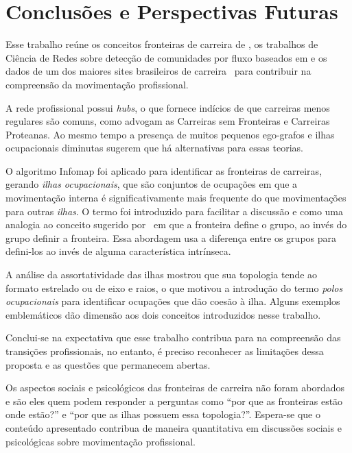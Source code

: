 \documentclass[
  article,
  11pt,
  a4paper,
  english,
  brazil,
  sumario=tradicional]{abntex2}
\begin{document}
\section{Conclusões e Perspectivas Futuras}

Esse trabalho reúne os conceitos fronteiras de carreira de , os trabalhos de Ciência de Redes sobre detecção de comunidades por fluxo baseados em \cite{Rosvall2009-sd} e os dados de um dos maiores sites brasileiros de carreira~\cite{VAGAS_Tecnologia2014-yv} para contribuir na compreensão da movimentação profissional.

A rede profissional possui \textit{hubs}, o que fornece indícios de que carreiras menos regulares são comuns, como advogam as Carreiras sem Fronteiras e Carreiras Proteanas. Ao mesmo tempo a presença de muitos pequenos ego-grafos e ilhas ocupacionais diminutas sugerem que há alternativas para essas teorias.

O algoritmo Infomap foi aplicado para identificar as fronteiras de carreiras, gerando \textit{ilhas ocupacionais}, que são conjuntos de ocupações em que a movimentação interna é significativamente mais frequente do que movimentações para outras \textit{ilhas}. O termo foi introduzido para facilitar a discussão e como uma analogia ao conceito sugerido por~\cite{Abbott1995-ft} em que a fronteira define o grupo, ao invés do grupo definir a fronteira. Essa abordagem usa a diferença entre os grupos para defini-los ao invés de alguma característica intrínseca. 

A análise da assortatividade das ilhas mostrou que sua topologia tende ao formato estrelado ou de eixo e raios, o que motivou a introdução do termo \textit{polos ocupacionais} para identificar ocupações que dão coesão à ilha. Alguns exemplos emblemáticos dão dimensão aos dois conceitos introduzidos nesse trabalho.

Conclui-se na expectativa que esse trabalho contribua para na compreensão das transições profissionais, no entanto, é preciso reconhecer as limitações dessa proposta e as questões que permanecem abertas.

Os aspectos sociais e psicológicos das fronteiras de carreira não foram abordados e são eles quem podem responder a perguntas como \enquote{por que as fronteiras estão onde estão?} e \enquote{por que as ilhas possuem essa topologia?}. Espera-se que o conteúdo apresentado contribua de maneira quantitativa em discussões sociais e psicológicas sobre movimentação profissional.
\end{document}
